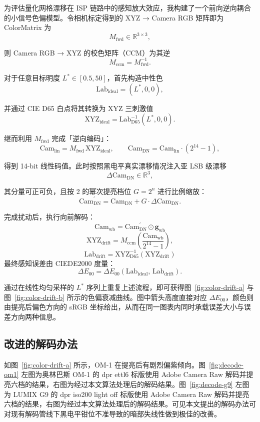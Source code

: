 \documentclass[journal]{IEEEtran}
\begin{document}
{
为评估量化网格漂移在 ISP 链路中的感知放大效应，我构建了一个前向逆向耦合的小信号色偏模型。令相机标定得到的 XYZ → Camera RGB 矩阵即为 ColorMatrix 为
\[
M_{\text{fwd}} \in \mathbb{R}^{3\times 3},
\]

则 Camera RGB → XYZ 的校色矩阵（CCM）为其逆
\[
M_{\text{ccm}} = M_{\text{fwd}}^{-1}.
\]

对于任意目标明度 $L^*\in[0.5,50]$，首先构造中性色
\[
\text{Lab}_{\text{ideal}}=(L^*,0,0),
\]

并通过 CIE D65 白点将其转换为 XYZ 三刺激值
\[
\text{XYZ}_{\text{ideal}} = \text{Lab}^{-1}_{\text{D65}}(L^*,0,0).
\]

继而利用 $M_{\text{fwd}}$ 完成「逆向编码」：
\[
\text{Cam}_{\text{lin}} = M_{\text{fwd}}\,\text{XYZ}_{\text{ideal}}, \qquad
\text{Cam}_{\text{DN}} = \text{Cam}_{\text{lin}} \cdot (2^{14}-1),
\]

得到 14-bit 线性码值。此时按照黑电平真实漂移情况注入亚 LSB 级漂移
\[
\Delta \text{Cam}_{\text{DN}} \in \mathbb{R}^3,
\]

其分量可正可负，且按 2 的幂次提亮档位 $G=2^n$ 进行比例缩放：
\[
\text{Cam}_{\text{DN}}^{\prime} = \text{Cam}_{\text{DN}} + G \cdot \Delta\text{Cam}_{\text{DN}}.
\]

完成扰动后，执行向前解码：
\[
\text{Cam}_{\text{wb}} = \text{Cam}_{\text{DN}}^{\prime} \odot \mathbf{g}_{\text{wb}}
\]
\[
\text{XYZ}_{\text{drift}} = M_{\text{ccm}}\left(\frac{\text{Cam}_{\text{wb}}}{2^{14}-1}\right),
\]
\[
\text{Lab}_{\text{drift}} = \text{XYZ}^{-1}_{\text{D65}}(\text{XYZ}_{\text{drift}})
\]
最终感知误差由 CIEDE2000 度量：
\[
\Delta E_{00} = \Delta E_{00}\!\left(\text{Lab}_{\text{ideal}},\,\text{Lab}_{\text{drift}}\right).
\]
}

通过在线性均匀采样的 $L^*$ 序列上重复上述流程，即可获得图~\ref{fig:color-drift-a} 与图~\ref{fig:color-drift-b} 所示的色偏衰减曲线。图中箭头高度直接对应 $\Delta E_{00}$，颜色则由提亮后偏色方向的 sRGB 坐标给出，从而在同一图表内同时承载误差大小与误差方向两种信息。


\subsection{改进的解码办法}


如图~\ref{fig:color-drift-a} 所示，OM-1 在提亮后有剧烈偏紫倾向。图~\ref{fig:decode-om1} 左图为奥林巴斯 OM-1 的 dpr ettl6 标版使用 Adobe Camera Raw 解码并提亮六档的结果，右图为经过本文算法处理后的解码结果。图~\ref{fig:decode-g9} 左图为 LUMIX G9 的 dpr iso200 light off 标版使用 Adobe Camera Raw 解码并提亮六档的结果，右图为经过本文算法处理后的解码结果。可见本文提出的解码办法可对现有解码管线下黑电平钳位不准导致的暗部失线性做到极佳的改善。
\end{document}

